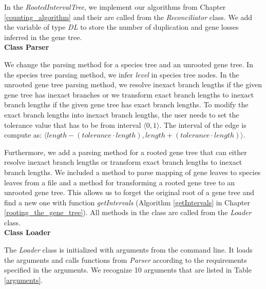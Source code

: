 In the \emph{RootedIntervalTree}, we implement our algorithms from Chapter \ref{counting_algorithm} and their are called from the \emph{Reconciliator} class. We add the variable of type \emph{DL} to store the number of duplication and gene losses inferred in the gene tree.\\
\textbf{Class Parser}

We change the parsing method for a species tree and an unrooted gene tree. In the species tree parsing method, we infer \emph{level} in species tree nodes. In the unrooted gene tree parsing method, we resolve inexact branch lengths if the given gene tree has inexact branches or we transform exact branch lengths to inexact branch lengths if the given gene tree has exact branch lengths. To modify the exact branch lengths into inexact branch lengths, the user needs to set the tolerance value that has to be from interval $\langle 0, 1 \rangle$. The interval of the edge is compute as: $\langle length - (tolerance \cdot length), length + (tolerance \cdot length) \rangle$.

Furthermore, we add a parsing method for a rooted gene tree that can either resolve inexact branch lengths or transform exact branch lengths to inexact branch lengths. We included a method to parse mapping of gene leaves to species leaves from a file and a method for transforming a rooted gene tree to an unrooted gene tree. This allows us to forget the original root of a gene tree and find a new one with function \emph{getIntervals} (Algorithm \ref{getIntervals} in Chapter \ref{rooting_the_gene_tree}). All methods in the class are called from the \emph{Loader} class.\\
\textbf{Class Loader}

The \emph{Loader} class is initialized with arguments from the command line. It loads the arguments and calls functions from \emph{Parser} according to the requirements specified in the arguments. We recognize 10 arguments that are listed in Table \ref{arguments}.

